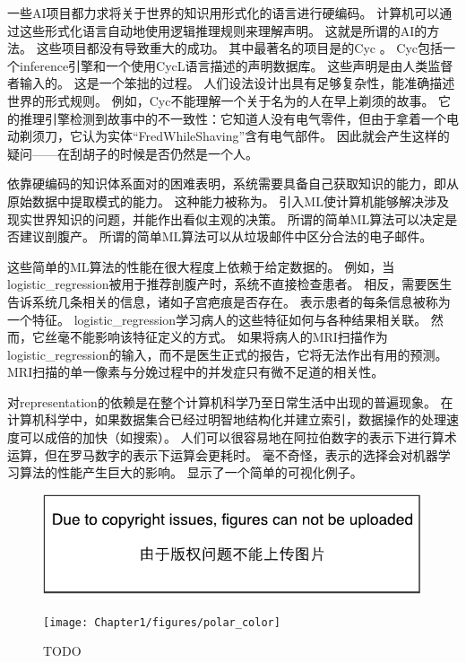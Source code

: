 一些\gls{AI}项目都力求将关于世界的知识用形式化的语言进行硬编码。
计算机可以通过这些形式化语言自动地使用逻辑推理规则来理解声明。
这就是所谓的\gls{AI}的方法。
这些项目都没有导致重大的成功。
其中最著名的项目是的Cyc \citep{Lenat-1989-book}。
Cyc包括一个\gls{inference}引擎和一个使用CycL语言描述的声明数据库。
这些声明是由人类监督者输入的。
这是一个笨拙的过程。
人们设法设计出具有足够复杂性，能准确描述世界的形式规则。
例如，Cyc不能理解一个关于名为的人在早上剃须的故事\citep{MachineChangedWorld}。
它的推理引擎检测到故事中的不一致性：它知道人没有电气零件，但由于拿着一个电动剃须刀，它认为实体``FredWhileShaving''含有电气部件。
因此就会产生这样的疑问——在刮胡子的时候是否仍然是一个人。

依靠硬编码的知识体系面对的困难表明，系统需要具备自己获取知识的能力，即从原始数据中提取模式的能力。
这种能力被称为。
引入\gls{ML}使计算机能够解决涉及现实世界知识的问题，并能作出看似主观的决策。
所谓的简单\gls{ML}算法可以决定是否建议剖腹产\citep{MorYosef90}。
所谓的简单\gls{ML}算法可以从垃圾邮件中区分合法的电子邮件。


这些简单的\gls{ML}算法的性能在很大程度上依赖于给定数据的。
例如，当\gls{logistic_regression}被用于推荐剖腹产时，系统不直接检查患者。
相反，需要医生告诉系统几条相关的信息，诸如子宫疤痕是否存在。
表示患者的每条信息被称为一个特征。
\gls{logistic_regression}学习病人的这些特征如何与各种结果相关联。
然而，它丝毫不能影响该特征定义的方式。
如果将病人的MRI扫描作为\gls{logistic_regression}的输入，而不是医生正式的报告，它将无法作出有用的预测。
MRI扫描的单一像素与分娩过程中的并发症只有微不足道的相关性。

对\gls{representation}的依赖是在整个计算机科学乃至日常生活中出现的普遍现象。
在计算机科学中，如果数据集合已经过明智地结构化并建立索引，数据操作的处理速度可以成倍的加快（如搜索）。
人们可以很容易地在阿拉伯数字的表示下进行算术运算，但在罗马数字的表示下运算会更耗时。
毫不奇怪，表示的选择会对机器学习算法的性能产生巨大的影响。
显示了一个简单的可视化例子。
\begin{figure}[!htb]
\ifOpenSource
\centerline{\includegraphics{figure.pdf}}
\else
\centerline{\texttt{[image: Chapter1/figures/polar\_color]}}
\fi
\caption{TODO}
\label{fig:chap1_polar}
\end{figure}

